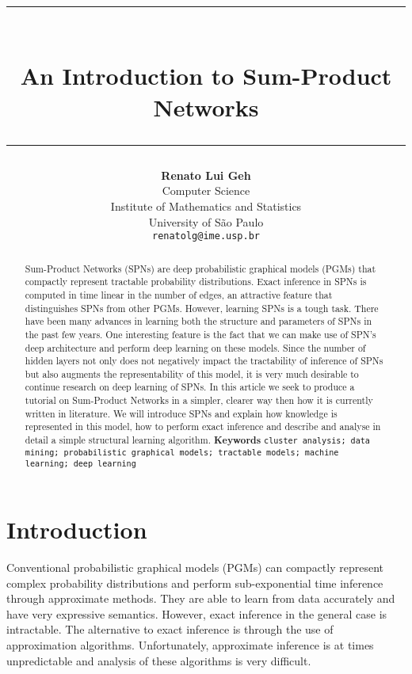 \documentclass{amsart}
\title{%
  \noindent\rule{13cm}{1.0pt}\\
  \vspace{0.2cm}
  An Introduction to Sum-Product Networks
  \noindent\rule{13cm}{0.8pt}
}
\author[]{\normalsize\textbf{Renato Lui Geh}\\\small Computer Science\\Institute of Mathematics
  and Statistics\\University of São Paulo\\\texttt{renatolg@ime.usp.br}}
\theoremstyle{plain}
\numberwithin{equation}{section}
\begin{document}
\begin{abstract}
  Sum-Product Networks (SPNs) are deep probabilistic graphical models (PGMs) that compactly
  represent tractable probability distributions. Exact inference in SPNs is computed in time linear
  in the number of edges, an attractive feature that distinguishes SPNs from other PGMs. However,
  learning SPNs is a tough task. There have been many advances in learning both the structure and
  parameters of SPNs in the past few years. One interesting feature is the fact that we can make
  use of SPN's deep architecture and perform deep learning on these models. Since the number of
  hidden layers not only does not negatively impact the tractability of inference of SPNs but also
  augments the representability of this model, it is very much desirable to continue research on
  deep learning of SPNs. In this article we seek to produce a tutorial on Sum-Product Networks in
  a simpler, clearer way then how it is currently written in literature. We will introduce SPNs
  and explain how knowledge is represented in this model, how to perform exact inference and
  describe and analyse in detail a simple structural learning algorithm.
  \smallskip
  \textbf{Keywords}
  \smallskip
  \texttt{cluster analysis; data mining; probabilistic graphical
    models; tractable models; machine learning; deep learning}
  \vspace*{-3.5em}
\end{abstract}

\maketitle

\section{Introduction}

Conventional probabilistic graphical models (PGMs) can compactly represent complex probability
distributions and perform sub-exponential time inference through approximate methods. They are able
to learn from data accurately and have very expressive semantics. However, exact inference in the
general case is intractable. The alternative to exact inference is through the use of approximation
algorithms. Unfortunately, approximate inference is at times unpredictable and analysis of these
algorithms is very difficult.
\end{document}

